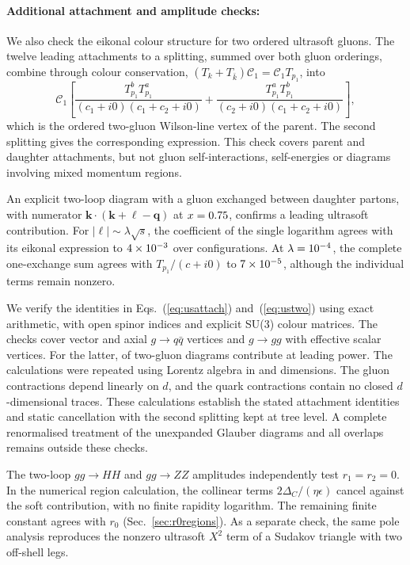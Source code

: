 \documentclass[%
 onecolumn,
 superscriptaddress,
 preprintnumbers,
 nofootinbib,
 amsmath,amssymb,
 aps,
 prl,
]{revtex4-2}
\newcommand{\kk}{\boldsymbol k}
\newcommand{\qq}{\boldsymbol q}
\newcommand{\DD}{\Delta_C}
\begin{document}
\paragraph{Additional attachment and amplitude checks: }
We also check the eikonal colour structure
for two ordered ultrasoft gluons.
The twelve leading attachments to a splitting,
summed over both gluon orderings, combine through
colour conservation,
$(T_k+T_{\bar k})\mathcal C_1
=\mathcal C_1T_{p_1}$, into
\begin{equation}
\mathcal C_1\left[
\frac{T_{p_1}^bT_{p_1}^a}{(c_1+i0)(c_1+c_2+i0)}+
\frac{T_{p_1}^aT_{p_1}^b}{(c_2+i0)(c_1+c_2+i0)}
\right],
\label{eq:ustwo}
\end{equation}
which is the ordered two-gluon Wilson-line
vertex of the parent. The second splitting
gives the corresponding expression.
This check covers parent and daughter
attachments, but not gluon self-interactions,
self-energies or diagrams involving mixed
momentum regions.

An explicit two-loop diagram with a gluon
exchanged between daughter partons, with
numerator $\kk\cdot(\kk+\boldsymbol\ell-\qq)$
at $x=0.75$, confirms a leading ultrasoft
contribution. For
$|\boldsymbol\ell|\sim\lambda\sqrt{s}$,
the coefficient of the single logarithm agrees
with its eikonal expression to $4\times10^{-3}$
over  configurations.
At $\lambda=10^{-4}$, the complete
one-exchange sum agrees with
$T_{p_1}/(c+i0)$ to $7\times10^{-5}$,
although the individual terms remain nonzero.

We verify the identities in
Eqs.~(\ref{eq:usattach}) and~(\ref{eq:ustwo})
using exact arithmetic, with open spinor indices
and explicit SU(3) colour matrices.
The checks cover vector and axial
$g\to q\bar q$ vertices and $g\to gg$
with effective scalar vertices.
For the latter, \usTwoGluonLeading{} of
\usTwoGluonGraphs{} two-gluon diagrams
contribute at leading power.
The calculations were repeated using Lorentz
algebra in \usDimLow{} and \usDimHigh{}
dimensions. The gluon contractions depend
linearly on $d$, and the quark contractions
contain no closed $d$-dimensional traces.
%
These calculations establish the stated
attachment identities and static cancellation
with the second splitting kept at tree level.
A complete renormalised treatment of the
unexpanded Glauber diagrams and all overlaps
remains outside these checks.

The two-loop $gg\to HH$ and $gg\to ZZ$
amplitudes independently test $r_1=r_2=0$.
In the numerical region calculation, the
collinear terms $2\DD/(\eta\epsilon)$ cancel
against the soft contribution, with no finite
rapidity logarithm. The remaining finite
constant agrees with $r_0$
(Sec.~\ref{sec:r0regions}).
As a separate check, the same pole analysis
reproduces the nonzero ultrasoft $X^2$ term
of a Sudakov triangle with two off-shell legs.
\end{document}
